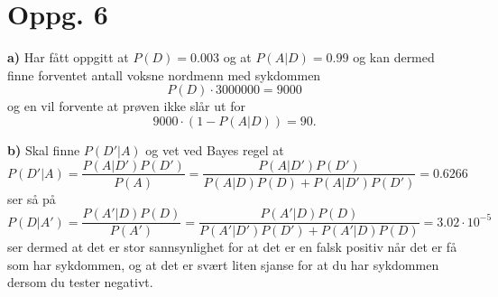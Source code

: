 \documentclass{report}
\newcommand{\nbrack}[1]{\left( #1 \right)}
\begin{document}
\section*{Oppg. 6}
\textbf{a)}
Har fått oppgitt at $P(D) = 0.003$ og at $P(A|D) = 0.99$ og kan dermed finne forventet antall voksne nordmenn med sykdommen
\begin{equation}
  \label{eq:12}
  P(D) \cdot 3 000 000 = 9000
\end{equation}
og en vil forvente at prøven ikke slår ut for
\begin{equation}
  \label{eq:13}
  9000 \cdot \nbrack{ 1 - P(A|D) } = 90.
\end{equation}

\textbf{b)}
Skal finne $P(D' | A)$ og vet ved Bayes regel at
\begin{equation}
  \label{eq:14}
  P(D'|A) = \frac{ P(A | D')P(D') }{P(A)} = \frac{ P(A | D')P(D') }{P(A|D)P(D) + P(A|D')P(D')} = 0.6266
\end{equation}
ser så på
\begin{equation}
  \label{eq:17}
  P(D|A') = \frac{P(A'|D) P(D)}{P(A')} = \frac{P(A'|D) P(D)}{P(A'|D')P(D') + P(A'|D)P(D)} = 3.02\cdot 10^{-5}
\end{equation}
ser dermed at det er stor sannsynlighet for at det er en falsk positiv når det er få som har sykdommen, og at det er svært liten sjanse for at du har sykdommen dersom du tester negativt.
\end{document}
